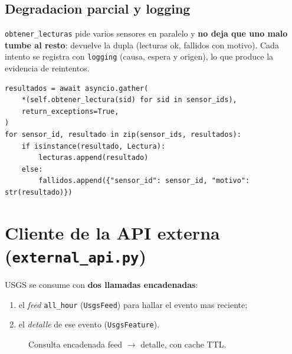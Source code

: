 \documentclass[11pt,a4paper]{article}
\newcommand{\arch}[1]{\texttt{#1}}
\begin{document}
\subsection{Degradacion parcial y logging}
\arch{obtener\_lecturas} pide varios sensores en paralelo y \textbf{no deja
que uno malo tumbe al resto}: devuelve la dupla (lecturas ok, fallidos con
motivo). Cada intento se registra con \arch{logging} (causa, espera y
origen), lo que produce la evidencia de reintentos.

\begin{lstlisting}[caption={Degradacion parcial}]
resultados = await asyncio.gather(
    *(self.obtener_lectura(sid) for sid in sensor_ids),
    return_exceptions=True,
)
for sensor_id, resultado in zip(sensor_ids, resultados):
    if isinstance(resultado, Lectura):
        lecturas.append(resultado)
    else:
        fallidos.append({"sensor_id": sensor_id, "motivo": str(resultado)})
\end{lstlisting}

\section{Cliente de la API externa (\arch{external\_api.py})}

USGS se consume con \textbf{dos llamadas encadenadas}:
\begin{enumerate}
  \item el \emph{feed} \arch{all\_hour} (\arch{UsgsFeed}) para hallar el
        evento mas reciente;
  \item el \emph{detalle} de ese evento (\arch{UsgsFeature}).
\end{enumerate}

\begin{figure}[H]
\centering
{}
\caption{Consulta encadenada feed $\rightarrow$ detalle, con cache TTL.}
\label{fig:usgs}
\end{figure}
\end{document}
